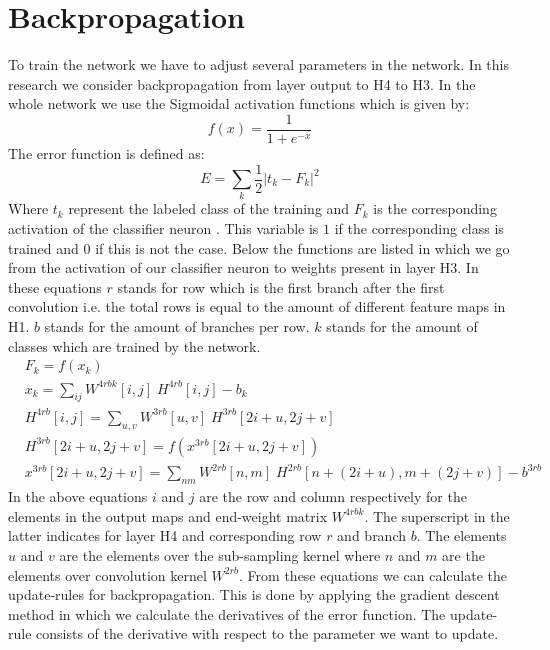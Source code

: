 \documentclass[a4paper,onecolumn]{report}
\begin{document}
\section{Backpropagation}
\label{sec:BP}
To train the network we have to adjust several parameters in the network. In this research we consider backpropagation from layer output to H4 to H3. In the whole network we use the Sigmoidal activation functions which is given by:
\begin{equation}
f(x)=\frac{1}{1+e^{-x}} 
\end{equation}	
The error function is defined as:
\begin{equation}
E=\sum_{k} \frac{1}{2}|t_k-F_{k}|^{2}
\end{equation}
Where $t_k$ represent the labeled class of the training and $F_{k}$ is the corresponding activation of the classifier neuron . This variable is $1$ if the corresponding class is trained and $0$ if this is not the case. Below the functions are listed in which we go from the activation of our classifier neuron to weights present in layer H3. In these equations $r$ stands for row which is the first branch after the first convolution i.e. the total rows is equal to the amount of different feature maps in H1. $b$ stands for the amount of branches per row. $k$ stands for the amount of classes which are trained by the network.
\begin{equation}
\begin{split}
	&F_{k}= f( x_{k}) \\
	& x_{k}=\sum_{ij} W^{4rbk}[i,j] \; H^{4rb}[i,j] - b_{k} \\
	&H^{4rb}[i,j]= \sum_{u,v} W^{3rb}[u,v] \; H^{3rb} [2i+u,2j+v] \\
	&H^{3rb} [2i+u,2j+v]= f\left (x^{3rb}[2i+u,2j+v] \right) \\
	&x^{3rb}[2i+u,2j+v]=\sum_{nm} W^{2rb}[n,m] \; H^{2rb}[n+(2i+u),m+(2j+v)] -b^{3rb}
\end{split}
\end{equation}
In the above equations $i$ and $j$ are the row and column respectively for the elements in the output maps and end-weight matrix $ W^{4rbk}$. The superscript in the latter indicates for layer H4 and corresponding row $r$ and branch $b$. The elements $u$ and $v$ are the elements over the sub-sampling kernel where $n$ and $m$ are the elements over convolution kernel $W^{2rb}$. From these equations we can calculate the update-rules for backpropagation. This is done by applying the gradient descent method in which we calculate the derivatives of the error function. The update-rule consists of the derivative with respect to the parameter we want to update.  
\end{document}

